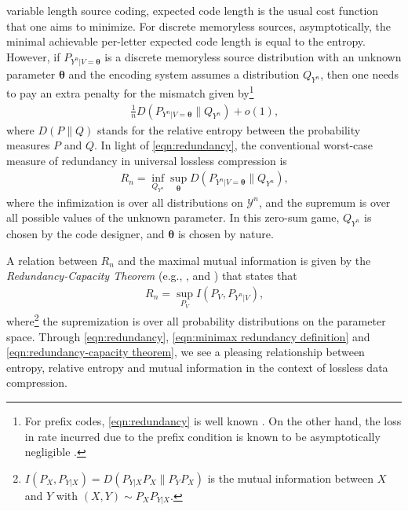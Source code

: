 \documentclass[journal, 10pt]{IEEEtran}
\newcommand{\cY}{\mathcal{Y}}
\theoremstyle{plain}
\theoremstyle{plain}
\theoremstyle{plain}
\theoremstyle{plain}
\newcommand{\boldtheta}{\mathbold{\theta}}
\begin{document}
 variable length source coding, expected code length is the usual cost function that one aims to minimize. For discrete memoryless sources, asymptotically, the minimal achievable per-letter expected code length is equal to the entropy. However, if $P_{Y^n|V=\boldtheta }$ is a discrete memoryless source distribution with an unknown parameter $\boldtheta$ and the encoding system assumes a distribution $Q_{Y^n}$, then one needs to pay an extra penalty for the mismatch given by\footnote{For prefix codes, \eqref{eqn:redundancy} is well known \cite[Theorem 5.4.3]{CoverThomas}. On the other hand, the loss in rate incurred due to the prefix condition is known to be asymptotically negligible \cite{KontoyiannisVerdu2014}.}
\begin{align}
	\frac{1}{n} D(P_{Y^n|V=\boldtheta}\| Q_{Y^n} )+ o(1)\text{,} \label{eqn:redundancy}
\end{align}
where $D(P\|Q)$ stands for the relative entropy between the probability measures $P$ and $Q$. In light of \eqref{eqn:redundancy}, the conventional worst-case measure of redundancy in universal lossless compression is
\begin{align}
	R_n=\inf_{Q_{Y^n} } \sup_{\boldtheta }D(P_{Y^n|V=\boldtheta }\| Q_{Y^n})\text{,} \label{eqn:minimax redundancy definition}
\end{align}
where the infimization is over all distributions on $\cY^n$, and the supremum is over all possible values of the unknown parameter. In this zero-sum game, $Q_{Y^n}$ is chosen by the code designer, and $\boldtheta$ is chosen by nature.

A relation between $R_n$ and the maximal mutual information is given by the \emph{Redundancy-Capacity Theorem} (e.g., \cite{Gallagher1976}, and \cite{Ryabko1979}) that states that
\begin{align}
	R_n=\sup_{P_V} I(P_V, P_{Y^n|V})\text{,} \label{eqn:redundancy-capacity theorem}
\end{align}
where\footnote{$I(P_X, P_{Y|X}) = D( P_{Y|X}P_X \| P_Y P_X )$ is the mutual information between $X$ and $Y$ with $(X,Y)\sim P_X P_{Y|X}$.} the supremization is over all probability distributions on the parameter space. Through \eqref{eqn:redundancy}, \eqref{eqn:minimax redundancy definition} and \eqref{eqn:redundancy-capacity theorem}, we see a pleasing relationship between entropy, relative entropy and mutual information in the context of lossless data compression.
\end{document}
